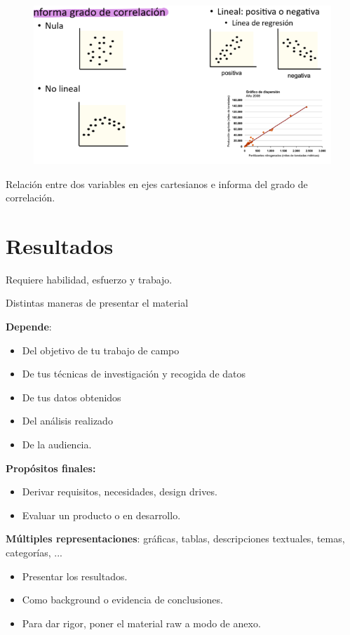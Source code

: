 \documentclass[12pt, twoside, openright]{report} %
\begin{document}
\begin{figure}[H]
	{\includegraphics[scale=.5]{Untitled 10.png}}
\end{figure}

Relación entre dos variables en ejes cartesianos e informa del grado de
correlación.
\pagebreak
\section{Resultados}

Requiere habilidad, esfuerzo y trabajo.

Distintas maneras de presentar el material

\textbf{Depende}:

\begin{itemize}
\item
  Del objetivo de tu trabajo de campo
\item
  De tus técnicas de investigación y recogida de datos
\item
  De tus datos obtenidos
\item
  Del análisis realizado
\item
  De la audiencia.
\end{itemize}

\textbf{Propósitos finales:}

\begin{itemize}
\item
  Derivar requisitos, necesidades, design drives.
\item
  Evaluar un producto o en desarrollo.
\end{itemize}

\textbf{Múltiples representaciones}: gráficas, tablas, descripciones textuales, temas, categorías, ...

\begin{itemize}
\item
  Presentar los resultados.
\item
  Como background o evidencia de conclusiones.
\item
  Para dar rigor, poner el material raw a modo de anexo.
\end{itemize}
\end{document}
